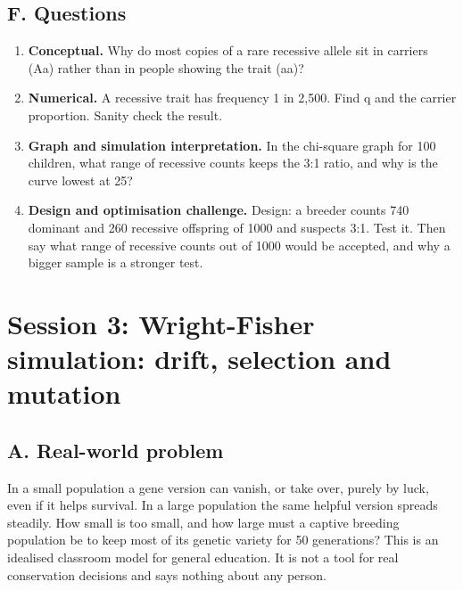 \documentclass[11pt,a4paper]{article}
\begin{document}
\subsection*{F. Questions}
\begin{enumerate}[nosep]
\item \textbf{Conceptual.} Why do most copies of a rare recessive allele sit in carriers (Aa) rather than in people showing the trait (aa)?
\item \textbf{Numerical.} A recessive trait has frequency 1 in 2,500. Find q and the carrier proportion. Sanity check the result.
\item \textbf{Graph and simulation interpretation.} In the chi-square graph for 100 children, what range of recessive counts keeps the 3:1 ratio, and why is the curve lowest at 25?
\item \textbf{Design and optimisation challenge.} Design: a breeder counts 740 dominant and 260 recessive offspring of 1000 and suspects 3:1. Test it. Then say what range of recessive counts out of 1000 would be accepted, and why a bigger sample is a stronger test.
\end{enumerate}

\section{Session 3: Wright-Fisher simulation: drift, selection and mutation}

\subsection*{A. Real-world problem}
In a small population a gene version can vanish, or take over, purely by luck, even if it helps survival. In a large population the same helpful version spreads steadily. How small is too small, and how large must a captive breeding population be to keep most of its genetic variety for 50 generations? This is an idealised classroom model for general education. It is not a tool for real conservation decisions and says nothing about any person.
\end{document}
